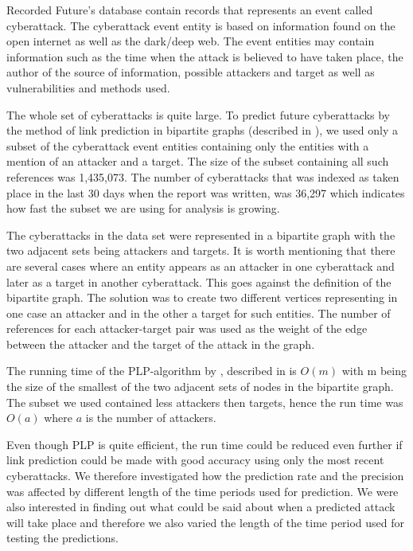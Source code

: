 Recorded Future's database contain records that represents an event called cyberattack. The cyberattack event entity is based on information found on the open internet as well as the dark/deep web. The event entities may contain information such as the time when the attack is believed to have taken place, the author of the source of information, possible attackers and target as well as vulnerabilities and methods used.

The whole set of cyberattacks is quite large. To predict future cyberattacks by the method of link prediction in bipartite graphs (described in ), we used only a subset of the cyberattack event entities containing only the entities with a mention of an attacker and a target. The size of the subset containing all such references was 1,435,073. The number of cyberattacks that was indexed as taken place in the last 30 days when the report was written, was 36,297 which indicates how fast the subset we are using for analysis is growing.

The cyberattacks in the data set were represented in a bipartite graph with the two adjacent sets being attackers and targets. It is worth mentioning that there are several cases where an entity appears as an attacker in one cyberattack and later as a target in another cyberattack. This goes against the definition of the bipartite graph. The solution was to create two different vertices representing in one case an attacker and in the other a target for such entities. The number of references for each attacker-target pair was used as the weight of the edge between the attacker and the target of the attack in the graph.

The running time of the PLP-algorithm by \citet{plp}, described in  is $O(m)$ with m being the size of the smallest of the two adjacent sets of nodes in the bipartite graph. The subset we used contained less attackers then targets, hence the run time was $O(a)$ where $a$ is the number of attackers.

Even though PLP is quite efficient, the run time could be reduced even further if link prediction could be made with good accuracy using only the most recent cyberattacks. We therefore investigated how the prediction rate and the precision was affected by different length of the time periods used for prediction. We were also interested in finding out what could be said about when a predicted attack will take place and therefore we also varied the length of the time period used for testing the predictions.

